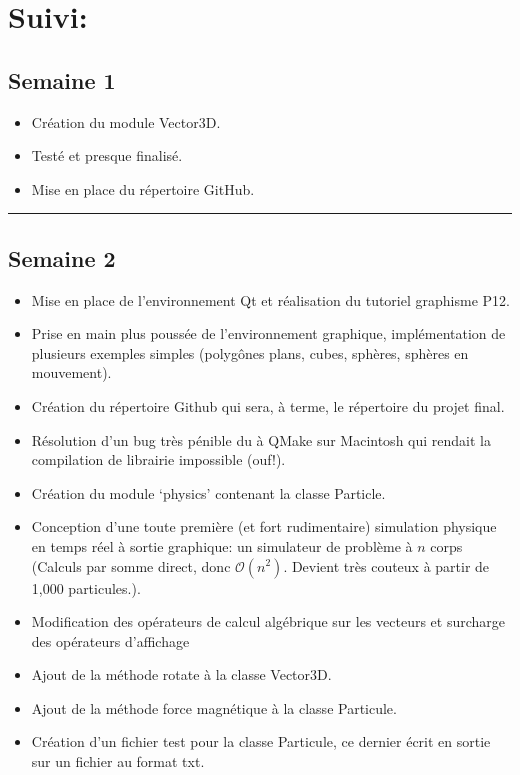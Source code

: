 \documentclass[12pt, letterpaper, twoside]{article}
\begin{document}
\section{Suivi:}

\subsection*{Semaine 1}
\begin{itemize}
\item Création du module Vector3D.
\item Testé et presque finalisé.
\item Mise en place du répertoire GitHub.
\end{itemize}

\rule{\textwidth}{0.4pt}

\subsection*{Semaine 2}
\begin{itemize}
	\item Mise en place de l’environnement Qt et réalisation du tutoriel graphisme P12.
	\item Prise en main plus poussée de l’environnement graphique, implémentation de plusieurs exemples simples (polygônes plans, cubes, sphères, sphères en mouvement).
	\item Création du répertoire Github qui sera, à terme, le répertoire du projet final.
	\item Résolution d’un bug très pénible du à QMake sur Macintosh qui rendait la compilation de librairie impossible (ouf!).
	\item Création du module `physics' contenant la classe Particle.
	\item Conception d’une toute première (et fort rudimentaire) simulation physique en temps réel à sortie graphique: un simulateur de problème à $n$ corps (Calculs par somme direct, donc $\mathcal{O}(n^2)$. Devient très couteux à partir de 1,000 particules.).
	\item Modification des opérateurs de calcul algébrique sur les vecteurs et surcharge des opérateurs d’affichage
	\item Ajout de la méthode rotate à la classe Vector3D.
	\item Ajout de la méthode force magnétique à la classe Particule.
	\item Création d’un fichier test pour la classe Particule, ce dernier écrit en sortie sur un fichier au format txt.
\end{itemize}
\end{document}
